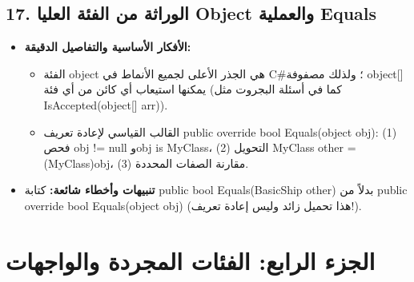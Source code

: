 \documentclass[14pt]{extarticle}
\begin{document}
\filbreak
\subsection*{17. الوراثة من الفئة العليا \textenglish{Object} والعملية \textenglish{Equals}}
\begin{itemize}[itemsep=0.3em]
    \item \textbf{الأفكار الأساسية والتفاصيل الدقيقة:}
    \begin{itemize}
        \item الفئة \textenglish{object} هي الجذر الأعلى لجميع الأنماط في \textenglish{C\#}؛ ولذلك مصفوفة \textenglish{object[]} يمكنها استيعاب أي كائن من أي فئة (كما في أسئلة البجروت مثل \textenglish{IsAccepted(object[] arr)}).
        \item القالب القياسي لإعادة تعريف \textenglish{public override bool Equals(object obj)}: (1) فحص \textenglish{obj != null} و\textenglish{obj is MyClass}، (2) التحويل \textenglish{MyClass other = (MyClass)obj}، (3) مقارنة الصفات المحددة.
    \end{itemize}
    \item \textbf{تنبيهات وأخطاء شائعة:} كتابة \textenglish{public bool Equals(BasicShip other)} بدلاً من \textenglish{public override bool Equals(object obj)} (هذا تحميل زائد وليس إعادة تعريف!).
\end{itemize}

\clearpage

\section*{الجزء الرابع: الفئات المجردة والواجهات}
\end{document}
